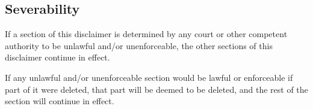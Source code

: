 \subsection{Severability}
If a section of this disclaimer is determined by any court or other competent authority to be unlawful and/or unenforceable, the other sections of this disclaimer continue in effect.  

If any unlawful and/or unenforceable section would be lawful or enforceable if part of it were deleted, that part will be deemed to be deleted, and the rest of the section will continue in effect.

